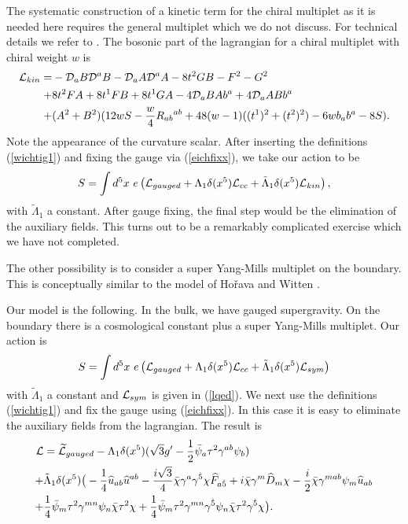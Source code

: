 \documentclass[a4paper,12pt, twoside]{article}
\numberwithin{equation}{section}
\begin{document}
The systematic construction of a kinetic term for the chiral multiplet 
as it is needed here requires the general multiplet which we do not 
discuss. For technical details we refer to \cite{Sohnius:1983xs, diss}. 
The bosonic part of the lagrangian for a chiral multiplet with chiral 
weight $w$ is
\begin{equation}
\begin{split}
{\cal L}_{kin} = & -{\cal D}_a B {\cal D}^a B - {\cal D}_a A {\cal D}^a 
A 
-8t^2 GB- F^2-G^2\\
+ & 8t^2 FA+8t^1FB + 8t^1GA-4{\cal D}_a  BA b^a+4{\cal D}_a  AB b^a\\
+ & 
(A^2+B^2)(12wS-\frac{w}{4}R_{ab}{}^{ab}+48(w-1)((t^1)^2+(t^2)^2)-6wb_ab^a-8S).
\end{split}\label{kinch}
\end{equation}
Note the appearance of the curvature scalar. After inserting the 
definitions (\ref{wichtig1}) and fixing the gauge via (\ref{eichfixx}), we 
take our action to be
\[
S=\int d^5x~e\left({\cal L}_{gauged}+\Lambda_1\delta(x^5){\cal 
L}_{cc}+\tilde{\Lambda}_1\delta(x^5){\cal L}_{kin}\right),
\]
with $\tilde{\Lambda}_1$ a constant.
After gauge fixing, the final step would be the elimination of the 
auxiliary fields. This turns out to be a remarkably complicated exercise 
which we have not completed.

\medskip

The other possibility is to consider a super Yang-Mills multiplet on 
the boundary. This is conceptually similar to the model of Ho\v{r}ava and 
Witten \cite{Horava:1996ma, Horava:1996qa}.

Our model is the following. In the bulk, we have gauged supergravity. 
On the boundary there is a cosmological constant plus a super Yang-Mills 
multiplet. Our action is
\[
S=\int d^5x~e\left({\cal L}_{gauged}+\Lambda_1\delta(x^5){\cal 
L}_{cc}+\tilde{\Lambda}_1\delta(x^5){\cal L}_{sym}\right)
\]
with $\tilde{\Lambda}_1$ a constant and ${\cal L}_{sym}$ is given in 
(\ref{lqed}). We next use the definitions (\ref{wichtig1}) and fix the 
gauge using (\ref{eichfixx}). 
In this case it is easy to eliminate the auxiliary fields from the 
lagrangian. The result is
\begin{equation}
\begin{split}
{\cal L} & = \widetilde{\cal L}_{gauged}-\Lambda_1 
\delta(x^5)(\sqrt{3}g'-\frac{1}{2}\bar{\psi}_a\tau^2\gamma^{ab}\psi_b)\\
+ & 
\tilde{\Lambda}_1\delta(x^5)\big(-\frac{1}{4}\widehat{u}_{ab}\widehat{u}^{ab}-\frac{i\sqrt{3}}{4}\bar{\chi}\gamma^a\gamma^{\dot{5}}\chi\widehat{F}_{a\dot{5}}+i\bar{\chi}\gamma^m\widehat{D}_m\chi-\frac{i}{2}\bar{\chi}\gamma^{mab}\psi_m\widehat{u}_{ab}\\
+ & \frac{1}{4}\bar{\psi}_m\tau^2\gamma^{mn}\psi_n\bar{\chi}\tau^2\chi 
+ 
\frac{1}{4}\bar{\psi}_m\tau^2\gamma^{mn}\gamma^{\dot{5}}\psi_n\bar{\chi}\tau^2\gamma^{\dot{5}}\chi\big).
\end{split}\label{sqedrs}
\end{equation}
\end{document}
